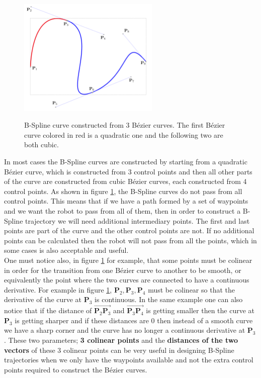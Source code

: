\begin{center}
\begin{figure}[!htb]
\centering
\includegraphics[width=0.6\textwidth]{images/b-spline-explanation.png}\\
\caption{B-Spline curve constructed from 3 B\'ezier curves. The first B\'ezier curve colored in red is a quadratic one and the following two are both cubic.} 
\label{b-spline-explanation}
\end{figure}
\end{center}

In most cases the B-Spline curves are constructed by starting from a quadratic B\'ezier curve, which is constructed from 3 control points and then all other 
parts of the curve are constructed from cubic B\'ezier curves, each constructed from 4 control points. As shown in figure \ref{b-spline-explanation}, the B-Spline 
curves do not pass from all control points. This means that if we have a path formed by a set of waypoints and we want the robot to pass from all of them, then 
in order to construct a B-Spline trajectory we will need additional intermediary points. The first and last points are part of the curve and the other control 
points are not. If no additional points can be calculated then the robot will not pass from all the points, which in some cases is also acceptable and useful. \\

One must notice also, in figure \ref{b-spline-explanation} for example, that some points must be colinear in order for the transition from one B\'ezier curve to another to be smooth, or equivalently 
the point where the two curves are connected to have a continuous derivative. For example in figure \ref{b-spline-explanation}, $\mathbf{P}_2, \mathbf{P}_3, \mathbf{P}_4$ must be colinear so that the 
derivative of the curve at $\mathbf{P}_3$ is continuous. In the same example one can also notice that if the distance of $\overrightarrow{\mathbf{P}_2\mathbf{P}_3}$ and $\overrightarrow{\mathbf{P}_3\mathbf{P}_4}$ 
is getting smaller then the curve at $\mathbf{P}_3$ is getting sharper and if these distances are $0$ then instead of a smooth curve we have a sharp corner and the curve has 
no longer a continuous derivative at $\mathbf{P}_3$. These two parameters; \textbf{3 colinear points} and the \textbf{distances of the two vectors} of these 3 colinear points can be very useful in designing 
B-Spline trajectories when we only have the waypoints available and not the extra control points required to construct the B\'ezier curves.\\

